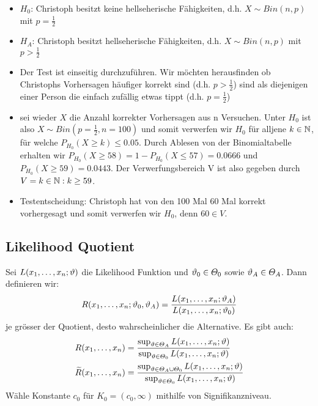 \begin{itemize}
  \item $H_0$: Christoph besitzt keine hellseherische Fähigkeiten, d.h. $ X \sim Bin(n, p)$ mit $p = \frac{1}{2}$
  \item $H_A$: Christoph besitzt hellseherische Fähigkeiten, d.h. $X \sim Bin(n, p)$ mit $p > \frac{1}{2}$
  \item Der Test ist einseitig durchzuführen. Wir möchten herausfinden ob Christophs Vorhersagen
  häufiger korrekt sind (d.h. $p > \frac{1}{2}$) sind als diejenigen einer Person die einfach zufällig
  etwas tippt (d.h. $p = \frac{1}{2}$)  
  \item sei wieder $X$ die Anzahl korrekter Vorhersagen aus n Versuchen. Unter $H_0$ ist also $X \sim Bin(p = \frac{1}{2}, n = 100)$ 
  und somit verwerfen wir $H_0$ für alljene $k \in \mathbb{N}$, für welche $P_{H_0} (X \geq k) \leq 0.05$. 
  Durch Ablesen von der Binomialtabelle erhalten wir $P_{H_0} (X \geq 58) = 1 - P_{H_0} (X \leq 57) = 0.0666$ und $P_{H_0} (X \geq 59) = 0.0443$.
  Der Verwerfungsbereich V ist also gegeben durch $V = {k \in \mathbb{N} : k \geq 59}$.
  \item Testentscheidung: Christoph hat von den 100 Mal 60 Mal korrekt vorhergesagt und somit
  verwerfen wir $H_0$, denn $60 \in V$.
\end{itemize}
\BoxEnd{}

\subsection*{Likelihood Quotient}
Sei $L (x_1, \dots, x_n; \vartheta)$ die Likelihood Funktion und $\vartheta_0 \in
  \varTheta_0$ sowie $\vartheta_A \in \varTheta_A$. Dann definieren wir:
\begin{align*}
  R (x_1, \dots, x_n; \vartheta_0, \vartheta_A) = \frac{L (x_1, \dots, x_n; \vartheta_A)}{L (x_1, \dots, x_n; \vartheta_0)}
\end{align*}
je grösser der Quotient, desto wahrscheinlicher die Alternative. Es gibt auch:
\begin{align*}
  R (x_1, \dots, x_n)             & = \frac{ \sup_{\vartheta \in \varTheta_A} L (x_1, \dots, x_n; \vartheta)}{\sup_{\vartheta \in \varTheta_0} L (x_1, \dots, x_n; \vartheta)}                  \\
  \widetilde{R} (x_1, \dots, x_n) & = \frac{ \sup_{\vartheta \in \varTheta_A \cup \varTheta_0} L (x_1, \dots, x_n; \vartheta)}{\sup_{\vartheta \in \varTheta_0} L (x_1, \dots, x_n; \vartheta)} \\
\end{align*}
Wähle Konstante $c_0$ für $K_0 =  (c_0, \infty)$ mithilfe von Signifikanzniveau.
